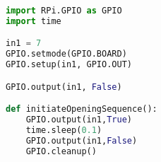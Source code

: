 \begin{lstlisting}[language=Python, caption=Relais code, label=lst:impl:relais]
import RPi.GPIO as GPIO
import time

in1 = 7
GPIO.setmode(GPIO.BOARD)
GPIO.setup(in1, GPIO.OUT)

GPIO.output(in1, False)

def initiateOpeningSequence():
    GPIO.output(in1,True)
    time.sleep(0.1)
    GPIO.output(in1,False)
    GPIO.cleanup()
\end{lstlisting}